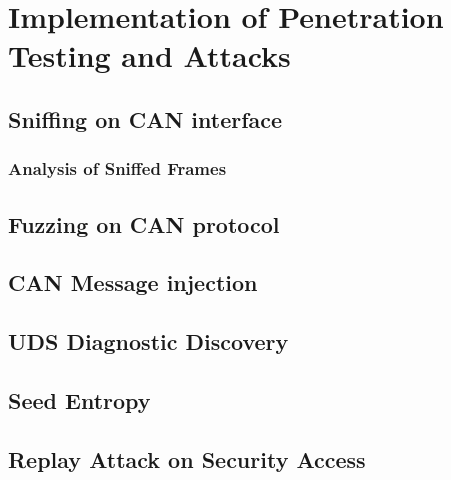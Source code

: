 \chapter{Implementation of Penetration Testing and Attacks}\label{ch:attacks}
\section{Sniffing on CAN interface}
\subsection{Analysis of Sniffed Frames}
\section{Fuzzing on CAN protocol}
\section{CAN Message injection}
\section{UDS Diagnostic Discovery}
\section{Seed Entropy}
\section{Replay Attack on Security Access}

